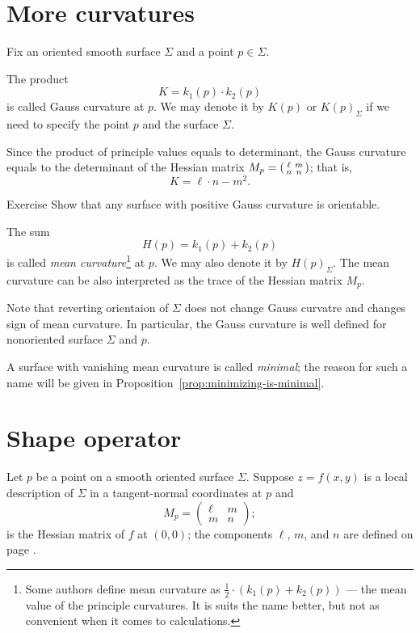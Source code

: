 \section*{More curvatures}

Fix an oriented smooth surface $\Sigma$ and a point $p\in\Sigma$.

The product 
\[K=k_1(p)\cdot k_2(p)\]
is called Gauss curvature at $p$.
We may denote it by $K(p)$ or $K(p)_\Sigma$ if we need to specify the point $p$ and the surface $\Sigma$.

Since the product of principle values equals to determinant,
the Gauss curvature equals to the determinant of the Hessian matrix 
$M_p\z=
(\begin{smallmatrix}
\ell&m\\n&n
\end{smallmatrix}
)
$;
that is,
\[K=\ell\cdot n-m^2.\]

\begin{thm}{Exercise}\label{ex:gauss+orientable}
Show that any surface with positive Gauss curvature is orientable. 
\end{thm}

The sum 
\[H(p)=k_1(p)+ k_2(p)\] 
is called \emph{mean curvature}\footnote{Some authors define mean curvature as $\tfrac12\cdot(k_1(p)+ k_2(p))$ --- the mean value of the principle curvatures. It is suits the name better, but not as convenient when it comes to calculations.} at $p$.
We may also denote it by $H(p)_\Sigma$.
The mean curvature can be also interpreted as the trace of the Hessian matrix $M_p$. 

Note that reverting orientaion of $\Sigma$ does not change Gauss curvatre and changes sign of mean curvature.
In particular, the Gauss curvature is well defined for nonoriented surface $\Sigma$ and $p$.

A surface with vanishing mean curvature is called \emph{minimal};
the reason for such a name will be given in Proposition~\ref{prop:minimizing-is-minimal}.

\section*{Shape operator}

Let $p$ be a point on a smooth oriented surface $\Sigma$.
Suppose $z=f(x,y)$ is a local description of $\Sigma$ in a tangent-normal coordinates at $p$
and 
\[M_p=\begin{pmatrix}
   \ell
   &m
   \\
   m
   &n
  \end{pmatrix};
\]
is the Hessian matrix of $f$ at $(0,0)$; the components $\ell$, $m$, and $n$ are defined on page \pageref{page:lmn}.

